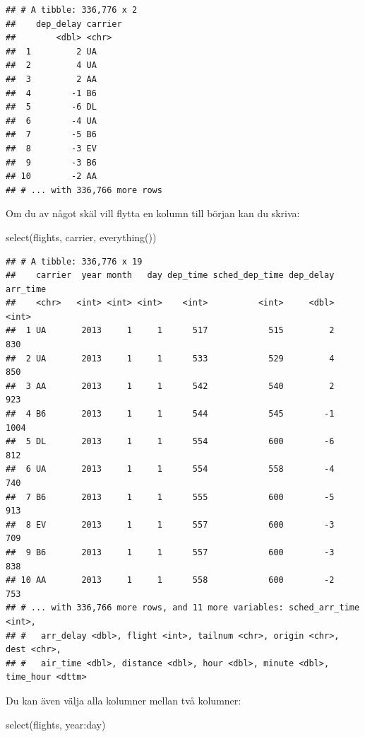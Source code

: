 \documentclass[
]{book}
\newenvironment{Shaded}{\begin{snugshade}}{\end{snugshade}}
\newcommand{\FunctionTok}[1]{\textcolor[rgb]{0.00,0.00,0.00}{#1}}
\newcommand{\NormalTok}[1]{#1}
\newcommand{\SpecialCharTok}[1]{\textcolor[rgb]{0.00,0.00,0.00}{#1}}
\begin{document}
\begin{verbatim}
## # A tibble: 336,776 x 2
##    dep_delay carrier
##        <dbl> <chr>  
##  1         2 UA     
##  2         4 UA     
##  3         2 AA     
##  4        -1 B6     
##  5        -6 DL     
##  6        -4 UA     
##  7        -5 B6     
##  8        -3 EV     
##  9        -3 B6     
## 10        -2 AA     
## # ... with 336,766 more rows
\end{verbatim}

Om du av något skäl vill flytta en kolumn till början kan du skriva:

\begin{Shaded}
\begin{Highlighting}[]
\FunctionTok{select}\NormalTok{(flights, carrier, }\FunctionTok{everything}\NormalTok{())}
\end{Highlighting}
\end{Shaded}

\begin{verbatim}
## # A tibble: 336,776 x 19
##    carrier  year month   day dep_time sched_dep_time dep_delay arr_time
##    <chr>   <int> <int> <int>    <int>          <int>     <dbl>    <int>
##  1 UA       2013     1     1      517            515         2      830
##  2 UA       2013     1     1      533            529         4      850
##  3 AA       2013     1     1      542            540         2      923
##  4 B6       2013     1     1      544            545        -1     1004
##  5 DL       2013     1     1      554            600        -6      812
##  6 UA       2013     1     1      554            558        -4      740
##  7 B6       2013     1     1      555            600        -5      913
##  8 EV       2013     1     1      557            600        -3      709
##  9 B6       2013     1     1      557            600        -3      838
## 10 AA       2013     1     1      558            600        -2      753
## # ... with 336,766 more rows, and 11 more variables: sched_arr_time <int>,
## #   arr_delay <dbl>, flight <int>, tailnum <chr>, origin <chr>, dest <chr>,
## #   air_time <dbl>, distance <dbl>, hour <dbl>, minute <dbl>, time_hour <dttm>
\end{verbatim}

Du kan även välja alla kolumner mellan två kolumner:

\begin{Shaded}
\begin{Highlighting}[]
\FunctionTok{select}\NormalTok{(flights, year}\SpecialCharTok{:}\NormalTok{day)}
\end{Highlighting}
\end{Shaded}
\end{document}
